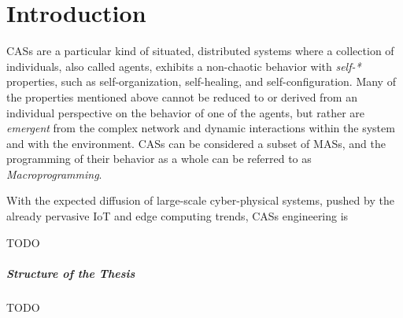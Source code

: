 \chapter{Introduction}
\label{chap:introduction}
\acp{CAS} are a particular kind of situated, distributed systems where a collection of individuals, also called agents, exhibits a non-chaotic behavior with \textit{self-*} properties, such as self-organization, self-healing, and self-configuration\cite{macroprogramming-state-of-the-art}.
%
Many of the properties mentioned above cannot be reduced to or derived from an individual perspective on the behavior of one of the agents, but rather are \textit{emergent} from the complex network and dynamic interactions within the system and with the environment\cite{macroprogramming-state-of-the-art}.
%
\acp{CAS} can be considered a subset of \acp{MAS}, and the programming of their behavior as a whole can be referred to as \textit{Macroprogramming}\cite{macroprogramming-state-of-the-art}.

With the expected diffusion of large-scale cyber-physical systems, pushed by the already pervasive \ac{IoT} and edge computing trends\cite{scafi}, \acp{CAS} engineering is 

TODO

\paragraph{Structure of the Thesis}

TODO
